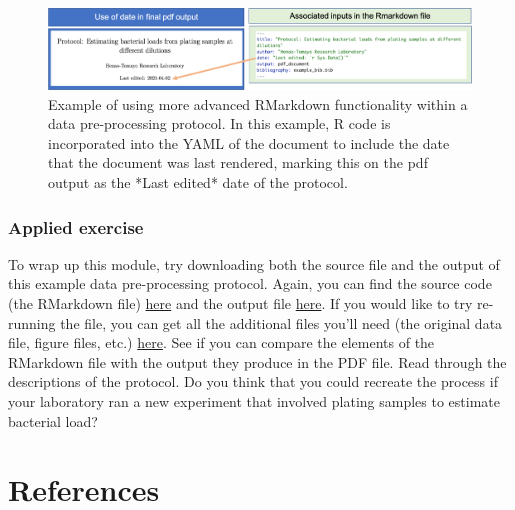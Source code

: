 \documentclass[]{tufte-book}
\begin{document}
\begin{figure}
\includegraphics[width=\textwidth]{figures/protocol_yaml_date} \caption[Example of using more advanced RMarkdown functionality within a data pre-processing protocol]{Example of using more advanced RMarkdown functionality within a data pre-processing protocol. In this example, R code is incorporated into the YAML of the document to include the date that the document was last rendered, marking this on the pdf output as the *Last edited* date of the protocol.}\label{fig:protocolyaml}
\end{figure}

\subsection{Applied exercise}\label{applied-exercise-3}

To wrap up this module, try downloading both the source file and the output of this example
data pre-processing protocol. Again, you can find the source code (the RMarkdown file)
\href{https://raw.githubusercontent.com/geanders/improve_repro/master/data/bactcountr_example_data/example_protocol.Rmd}{here} and the output file \href{https://github.com/geanders/improve_repro/raw/master/data/bactcountr_example_data/example_protocol.pdf}{here}. If you would like to try re-running the file, you can get all the additional files
you'll need (the original data file, figure files, etc.) \href{https://github.com/geanders/improve_repro/tree/master/data/bactcountr_example_data}{here}. See if
you can compare the elements of the RMarkdown file with the output they produce in the
PDF file. Read through the descriptions of the protocol. Do you think that you could recreate
the process if your laboratory ran a new experiment that involved plating samples to
estimate bacterial load?

\chapter{References}\label{references}


\end{document}
